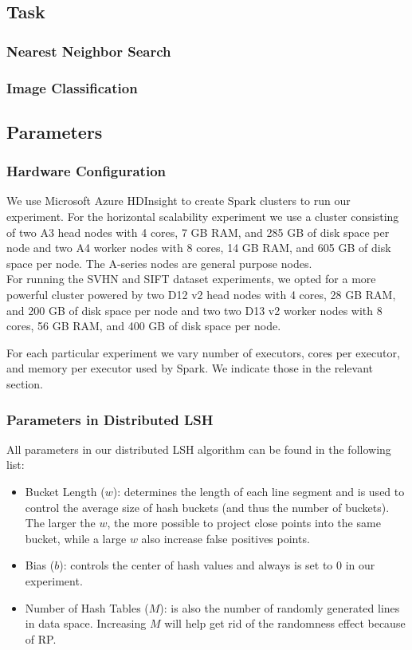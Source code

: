 \documentclass[letterpaper,twocolumn,10pt]{article}
\theoremstyle{definition}
\begin{document}
\subsection{Task}
\subsubsection{Nearest Neighbor Search}
\subsubsection{Image Classification}
\subsection{Parameters}
\subsubsection{Hardware Configuration}

We use Microsoft Azure HDInsight to create Spark clusters to run our 
experiment. For the horizontal scalability experiment we use a cluster consisting 
of two A3 head nodes with 4 cores, 7 GB RAM, and 285 GB of disk space per node and 
two A4 worker nodes with 8 cores, 14 GB RAM, and 605 GB of disk space per node. The 
A-series nodes are general purpose nodes.  \\ 

For running the SVHN and SIFT dataset experiments, we opted for a more powerful 
cluster powered by two D12 v2 head nodes with 4 cores, 28 GB RAM, and 200 GB of 
disk space per node and two two D13 v2 worker nodes with 8 cores, 56 GB RAM, and 
400 GB of disk space per node. 

For each particular experiment we vary number of executors, cores per executor, and 
memory per executor used by Spark. We indicate those in the relevant section.

\subsubsection{Parameters in Distributed LSH }

All parameters in our distributed LSH algorithm can be found in the following list:

\begin{itemize}
	\item Bucket Length ($w$): determines the length of each line segment and is used to control the average size of hash buckets (and thus the number of buckets). The larger the $w$, the more possible to project close points into the same bucket, while a large $w$ also increase false positives points.
	\item Bias ($b$): controls the center of hash values and always is set to 0 in our experiment.
	\item Number of Hash Tables ($M$): is also the number of randomly generated lines in data space. Increasing $M$ will help get rid of the randomness effect because of RP. 
\end{itemize}
\end{document}
